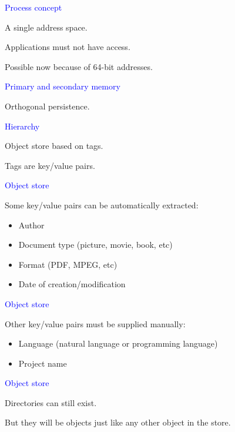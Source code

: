 \documentclass{slides}
\newcommand{\ti}[1]{\begin{center}\Large{\textcolor{blue}{#1}}\end{center}}
\begin{document}
\begin{slide}\ti{Process concept}

A single address space.

Applications must not have access.

Possible now because of 64-bit addresses.

\vfill\end{slide}
\begin{slide}\ti{Primary and secondary memory}

Orthogonal persistence.

\vfill\end{slide}
\begin{slide}\ti{Hierarchy}

Object store based on tags.

Tags are key/value pairs.

\vfill\end{slide}
\begin{slide}\ti{Object store}

Some key/value pairs can be automatically extracted:

\begin{itemize}
\item Author
\item Document type (picture, movie, book, etc)
\item Format (PDF, MPEG, etc)
\item Date of creation/modification
\end{itemize}

\vfill\end{slide}
\begin{slide}\ti{Object store}

Other key/value pairs must be supplied manually:

\begin{itemize}
\item Language (natural language or programming language)
\item Project name
\end{itemize}

\vfill\end{slide}
\begin{slide}\ti{Object store}

Directories can still exist.

But they will be objects just like any other object in the store.

\vfill\end{slide}
\end{document}
